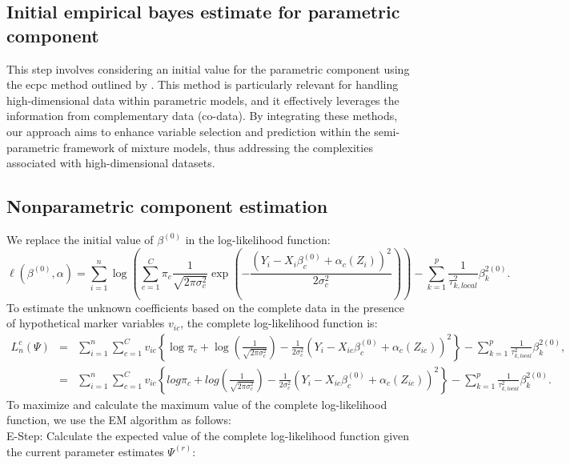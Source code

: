 \subsection{Initial empirical bayes estimate for parametric component}
\qquad This step involves considering an initial value for the parametric component using the ecpc method outlined by \hbox{\cite{Vannee2021}}. This method is particularly relevant for handling high-dimensional data within parametric models, and it effectively leverages the information from complementary data (co-data). By integrating these methods, our approach aims to enhance variable selection and prediction within the semi-parametric framework of mixture models, thus addressing the complexities associated with high-dimensional datasets.

\subsection{Nonparametric component estimation}\label{sec:intro}
\qquad We replace the initial value of $ \beta^{(0)} $ in the log-likelihood function:
\[	\ell(\beta^{(0)}, \alpha) =\sum_{i=1}^n \log \left(\sum_{c=1}^C \pi_c \frac{1}{\sqrt{2 \pi \sigma_c^2}} \exp \left( -\frac{(Y_i - X_i \beta_{c}^{(0)} + \alpha_c(Z_i))^2}{2 \sigma_c^2} \right) \right) - \sum_{k=1}^{p} \frac{1}{\tau^2_{k,local}} \beta^{2(0)}_{k}.
\]
To estimate the unknown coefficients based on the complete data in the presence of hypothetical marker variables $ v_{ic} $, the complete log-likelihood function is:
\begin{eqnarray}
	\label{eq3}
	L_{n}^{c}(\Psi) & = & \sum_{i=1}^{n} \sum_{c=1}^{C} v_{ic} \left\{ \log \pi_{c} + \log \left( \frac{1}{\sqrt{2 \pi \sigma^{2}_{c}}} \right) - \frac{1}{2 \sigma^{2}_{c}} (Y_{i} - X_{ic} \beta^{(0)}_{c} + \alpha_{c}(Z_{ic}))^{2} \right\} - \sum_{k=1}^{p} \frac{1}{\tau^2_{k,local}} \beta^{2(0)}_k ,  \\
		& = & \sum_{i=1}^{n} \sum_{c=1}^{C} v_{ic} \left\{ log \pi_{c} + log ( \frac{1}{\sqrt{2 \pi \sigma^{2}_{c}}}) - \frac{1}{2 \sigma^{2}_{c}} (Y_{i}- X_{ic} \beta^{(0)}_{c} + \alpha_{c} (Z_{ic} ))^{2} \right\} - \sum_{k=1}^{p} \frac{1}{\tau^2_{k,local}} \beta^{2(0)}_k  . \nonumber
\end{eqnarray}
To maximize and calculate the maximum value of the complete log-likelihood function, we use the EM algorithm as follows:\\
E-Step: Calculate the expected value of the complete log-likelihood function given the current parameter estimates $ \Psi^{(r)} $:

